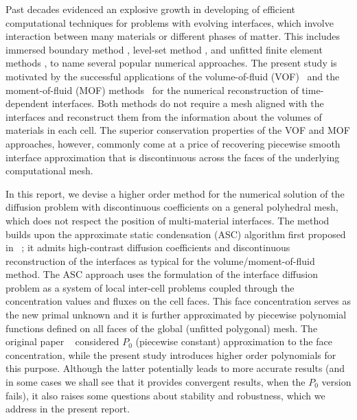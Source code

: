 \documentclass[12pt]{article}
\begin{document}
 Past decades evidenced an 	explosive growth in developing of efficient computational techniques for problems with evolving interfaces, which involve interaction between many materials or different phases of matter. This includes immersed boundary method \cite{peskin2002immersed}, level-set method \cite{sethian1999level}, and unfitted finite element methods \cite{belytschko2009review,burman2015cutfem}, to name several popular numerical approaches.
 The present study is motivated by the successful applications of the volume-of-fluid (VOF)~\cite{hirt1981volume} and the moment-of-fluid (MOF) methods~\cite{ahn2009adaptive} for the numerical  reconstruction of time-dependent interfaces. Both  methods do not require a mesh aligned with the  interfaces and reconstruct them from the information about the volumes of materials in each cell.
 The superior conservation properties of the  VOF and MOF approaches, however, commonly come at a price of recovering piecewise smooth interface approximation that is  discontinuous across the faces of the underlying computational mesh.

In this report, we devise  a higher order method for the numerical solution of the diffusion problem with discontinuous  coefficients on a general polyhedral mesh, which does not respect the position of multi-material interfaces.  The method builds upon the approximate static condensation (ASC) algorithm first  proposed in ~\cite{kikinzon2017approximate}; it admits high-contrast diffusion coefficients and discontinuous reconstruction of the interfaces as typical for the volume/moment-of-fluid method. The ASC approach uses the formulation of the interface diffusion problem as a system of local inter-cell problems  coupled through the concentration values and fluxes on the cell faces. This face concentration serves as the new primal unknown and it is further approximated by piecewise  polynomial functions defined on all faces of the global (unfitted polygonal) mesh. The original paper ~\cite{kikinzon2017approximate} considered $P_0$ (piecewise constant) approximation to the face concentration, while the present study introduces higher order polynomials for this purpose.
Although the latter potentially leads to more accurate results  (and in some cases we shall see that it provides convergent results, when the $P_0$ version fails), it also raises some questions about stability and robustness, which we address in the present report.
\end{document}

